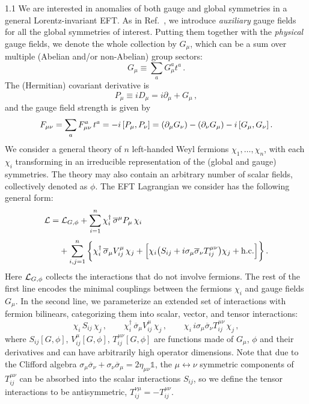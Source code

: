 \documentclass[a4paper,12pt]{article}
\def\L{{\cal L}}
\def\F{F}
\begin{document}
\begin{spacing}{1.1}
We are interested in anomalies of both gauge and global symmetries in a general Lorentz-invariant EFT. As in Ref.~\cite{Paper1}, we introduce \emph{auxiliary} gauge fields for all the global symmetries of interest. Putting them together with the \emph{physical} gauge fields, we denote the whole collection by $G_\mu$, which can be a sum over multiple (Abelian and/or non-Abelian) group sectors:
\begin{equation}
G_\mu \equiv \sum_{a} G_\mu^a t^a \,.
\label{eqn:Gdef}
\end{equation}
The (Hermitian) covariant derivative is
\begin{equation}
P_\mu \equiv i D_\mu = i \partial_\mu + G_\mu \,,
\end{equation}
and the gauge field strength is given by
\begin{equation}
\F_{\mu\nu} = \sum_a \F_{\mu\nu}^a\, t^a = -i\, \comm{P_\mu}{P_\nu} = \left(\partial_\mu G_\nu\right) - \left(\partial_\nu G_\mu\right) - i\, \comm{G_\mu}{G_\nu} \,.
\end{equation}
We consider a general theory of $n$ left-handed Weyl fermions $\chi_1, \dots, \chi_n$, with each $\chi_i$ transforming in an irreducible representation of the (global and gauge) symmetries. The theory may also contain an arbitrary number of scalar fields, collectively denoted as $\phi$. The EFT Lagrangian we consider has the following general form:
\begin{align}
\L =&\; \L_{G,\phi} + \sum_{i=1}^n \chi^\dagger_i \,\overline{\sigma}^\mu P_\mu\, \chi_i \notag\\[3pt]
& + \sum_{i,j=1}^n \bigg\{ \chi^\dagger_i\,\overline{\sigma}_\mu V^\mu_{ij}\, \chi_j + \Big[ \chi_i \bigl(S_{ij} + i\sigma_\mu\overline{\sigma}_\nu T^{\mu\nu}_{ij}\bigr) \chi_j + \text{h.c.} \Big] \bigg\} \,.
\label{eq:L_explicit}
\end{align}
Here $\L_{G,\phi}$ collects the interactions that do not involve fermions. The rest of the first line encodes the minimal couplings between the fermions $\chi_i$ and gauge fields $G_\mu$. In the second line, we parameterize an extended set of interactions with fermion bilinears, categorizing them into scalar, vector, and tensor interactions:
\begin{equation}
\chi_i\, S_{ij}\, \chi_j \,,\qquad
\chi_i^\dagger\, \overline\sigma_\mu V_{ij}^\mu\, \chi_j \,,\qquad
\chi_i\, i\sigma_\mu \overline\sigma_\nu T_{ij}^{\mu\nu}\, \chi_j \,,
\end{equation}
where $S_{ij}[G,\phi]$, $V_{ij}^\mu[G,\phi]$, $T_{ij}^{\mu\nu}[G,\phi]$ are functions made of $G_\mu$, $\phi$ and their derivatives and can have arbitrarily high operator dimensions. Note that due to the Clifford algebra $\sigma_\mu \overline\sigma_\nu + \sigma_\nu \overline\sigma_\mu = 2\eta_{\mu\nu}\mathbb{1}$, the $\mu\leftrightarrow\nu$ symmetric components of $T_{ij}^{\mu\nu}$ can be absorbed into the scalar interactions $S_{ij}$, so we define the tensor interactions to be antisymmetric, $T_{ij}^{\nu\mu}=-T_{ij}^{\mu\nu}$.


\end{spacing}
\end{document}
